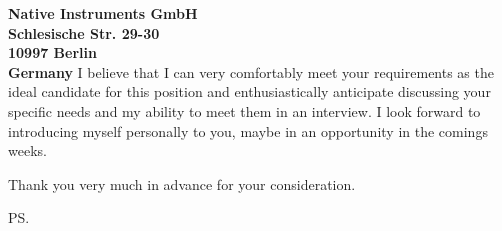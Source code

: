 \documentclass[a4paper]{joaosoares-letter}
\begin{document}
\begin{letter}{\bfseries Native Instruments GmbH\\Schlesische Str. 29-30\\10997 Berlin\\Germany}
I believe that I can very comfortably meet your requirements as the ideal candidate for this position and enthusiastically anticipate discussing your specific needs and my ability to meet them in an interview. I look forward to introducing myself personally to you, maybe in an opportunity in the comings weeks.

\closing{ Thank you very much in advance for your consideration.}
\vspace{20pt}
\ps

\vspace{\fill}

\end{letter}
\end{document}
